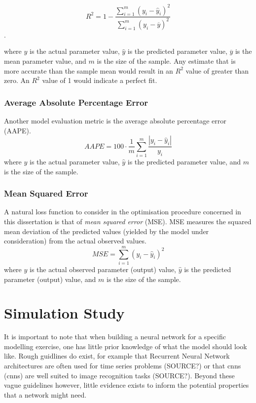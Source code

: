 \documentclass[11pt,oneside,openany,a4paper,english, report, goldenblock
]{usthesis}
\begin{document}
\begin{equation}
R^2 = 1 - \frac{\sum_{i=1}^{m}\left(y_i-\hat{y}_i\right)^2}{\sum_{i=1}^{m}\left(y_i-\overline{y}\right)^2}
\end{equation}.

where $y$ is the actual parameter value, $\hat{y}$ is the predicted parameter value, $\overline{y}$ is the mean parameter value, and $m$ is the size of the sample. Any estimate that is more accurate than the sample mean would result in an $ R^2 $ value of greater than zero. An $ R^2 $ value of 1 would indicate a perfect fit.

\subsection{Average Absolute Percentage Error}
Another model evaluation metric is the average absolute percentage error (AAPE).
\begin{equation}
AAPE = 100 \cdot \frac{1}{m} \sum_{i=1}^{m} \frac{\left| y_i - \hat{y}_i \right|}{y_i}
\end{equation}
where $y$ is the actual parameter value, $\hat{y}$ is the predicted parameter value, and $m$ is the size of the sample.

\subsection{Mean Squared Error}
A natural loss function to consider in the optimisation procedure concerned in this dissertation is that of \textit{mean squared error} (MSE). MSE measures the squared mean deviation of the predicted values (yielded by the model under consideration) from the actual observed values.
\begin{equation}
MSE = \sum_{i=1}^{m}\left(y_i-\hat{y}_i\right)^2
\end{equation}
where $y$ is the actual observed parameter (output) value, $\hat{y}$ is the predicted parameter (output) value, and $m$ is the size of the sample.

\chapter{Simulation Study}
\label{chapter:simulation_study}

It is important to note that when building a neural network for a specific modelling exercise, one has little prior knowledge of what the model should look like. Rough guidlines do exist, for example that Recurrent Neural Network architectures are often used for time series problems (SOURCE?) or that \acrlong{cnn}s (\acrshort{cnn}s) are well suited to image recognition tasks (SOURCE?). Beyond these vague guidelines however, little evidence exists to inform the potential properties that a network might need.
\end{document}
